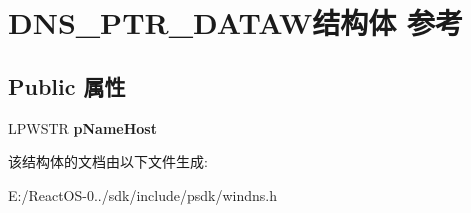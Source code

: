 \hypertarget{struct_d_n_s___p_t_r___d_a_t_a_w}{}\section{D\+N\+S\+\_\+\+P\+T\+R\+\_\+\+D\+A\+T\+A\+W结构体 参考}
\label{struct_d_n_s___p_t_r___d_a_t_a_w}
\subsection*{Public 属性}
\begin{DoxyCompactItemize}
\item 
\mbox{\label{struct_d_n_s___p_t_r___d_a_t_a_w_a210b4da39fc870e34900e135584a2248}} 
L\+P\+W\+S\+TR {\bfseries p\+Name\+Host}
\end{DoxyCompactItemize}


该结构体的文档由以下文件生成\+:\begin{DoxyCompactItemize}
\item 
E\+:/\+React\+O\+S-\/0../sdk/include/psdk/windns.\+h\end{DoxyCompactItemize}
